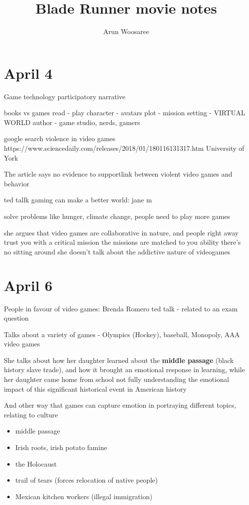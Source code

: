 \documentclass{article}
\title{Blade Runner movie notes}
\author{Arun Woosaree}
\begin{document}
\section{April 4}
Game technology participatory narrative

books vs games
read - play
character - avatars
plot - mission
setting - VIRTUAL WORLD
author - game studio, nerds, gamers


google search violence in video games
https://www.sciencedaily.com/releases/2018/01/180116131317.htm
University of York

The article says no evidence to supportlink between violent video games and behavior


ted tallk gaming can make a better world:
jane m

solve problems like hunger, climate change,
people need to play more games

she argues that video games are collaborative in nature,
and people right away trust you with a critical mission
the missions are matched to you ability
there's no sitting around
she doesn't talk about the addictive nature of videogames

\section{April 6}
People in favour of video games:
Brenda Romero ted talk - related to an exam question

Talks about a variety of games - Olympics (Hockey), baseball, Monopoly, AAA video games

She talks about how her daughter learned about the \textbf{middle passage} (black history slave trade),
and how it brought an emotional response in learning, while her daughter came home from school
not fully understanding the emotional impact of this significant historical event in American history

And other way that games can capture emotion in portraying different topics, relating to culture

\begin{itemize}
 \item middle passage
 \item Irish roots, irish potato famine
 \item the Holocaust
 \item trail of tears (forces relocation of native people)
 \item Mexican kitchen workers (illegal immigration)
\end{itemize}
\end{document}
